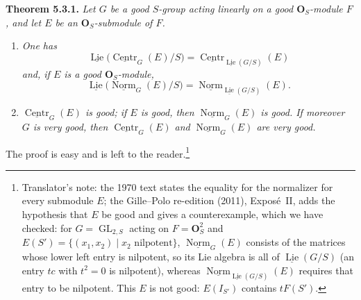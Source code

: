 \medskip
\noindent{}\textbf{Theorem 5.3.1.}
\textit{Let \(G\) be a good \(S\)-group acting linearly on a good
\(\mathbf O_S\)-module \(F\), and let \(E\) be an
\(\mathbf O_S\)-submodule of \(F\).}
\begin{enumerate}
\renewcommand{\labelenumi}{(\roman{enumi})}
\item \textit{One has}
\[
 \underline{\operatorname{Lie}}
   \bigl(\underline{\operatorname{Centr}}_G(E)/S\bigr)
 =
 \underline{\operatorname{Centr}}_
   {\underline{\operatorname{Lie}}(G/S)}(E)
\]
\textit{and, if \(E\) is a good \(\mathbf O_S\)-module,}
\[
 \underline{\operatorname{Lie}}
   \bigl(\underline{\operatorname{Norm}}_G(E)/S\bigr)
 =
 \underline{\operatorname{Norm}}_
   {\underline{\operatorname{Lie}}(G/S)}(E).
\]
\item \textit{\(\underline{\operatorname{Centr}}_G(E)\) is good; if \(E\)
is good, then \(\underline{\operatorname{Norm}}_G(E)\) is good. If
moreover \(G\) is very good, then \(\underline{\operatorname{Centr}}_G(E)\)
and \(\underline{\operatorname{Norm}}_G(E)\) are very good.}
\end{enumerate}
The proof is easy and is left to the reader.\footnote{Translator's note: the
1970 text states the equality for the normalizer for every submodule
\(E\); the Gille--Polo re-edition (2011), Expos\'e~II, adds the hypothesis
that \(E\) be good and gives a counterexample, which we have checked: for
\(G=\operatorname{GL}_{2,S}\) acting on \(F=\mathbf O_S^2\) and
\(E(S')=\{(x_1,x_2)\mid x_2\text{ nilpotent}\}\),
\(\underline{\operatorname{Norm}}_G(E)\) consists of the matrices whose
lower left entry is nilpotent, so its Lie algebra is all of
\(\underline{\operatorname{Lie}}(G/S)\) (an entry \(tc\) with \(t^2=0\) is
nilpotent), whereas \(\underline{\operatorname{Norm}}_{\underline{\operatorname{Lie}}(G/S)}(E)\)
requires that entry to be nilpotent. This \(E\) is not good:
\(E(I_{S'})\) contains \(tF(S')\).}

